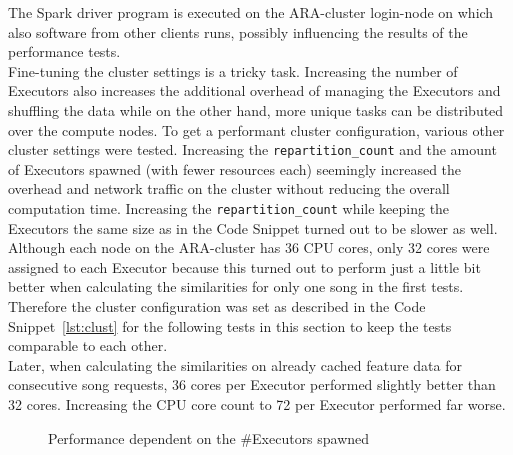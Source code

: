 \noindent The Spark driver program is executed on the ARA-cluster login-node on which also software from other clients runs, possibly influencing the results of the performance tests.\\
Fine-tuning the cluster settings is a tricky task. Increasing the number of Executors also increases the additional overhead of managing the Executors and shuffling the data while on the other hand, more unique tasks can be distributed over the compute nodes. To get a performant cluster configuration, various other cluster settings were tested. Increasing the \lstinline{repartition_count} and the amount of Executors spawned (with fewer resources each) seemingly increased the overhead and network traffic on the cluster without reducing the overall computation time. Increasing the \lstinline{repartition_count} while keeping the Executors the same size as in the Code Snippet turned out to be slower as well.\\ 
Although each node on the ARA-cluster has 36 CPU cores, only 32 cores were assigned to each Executor because this turned out to perform just a little bit better when calculating the similarities for only one song in the first tests. Therefore the cluster configuration was set as described in the Code Snippet~\ref{lst:clust} for the following tests in this section to keep the tests comparable to each other.\\
Later, when calculating the similarities on already cached feature data for consecutive song requests, 36 cores per Executor performed slightly better than 32 cores. Increasing the CPU core count to 72 per Executor performed far worse.\\ 

\FloatBarrier
\begin{figure}[htbp]
   	\centering
   	\caption{Performance dependent on the \#Executors spawned}
   	\label{perfspark7}
\end{figure}
\FloatBarrier

